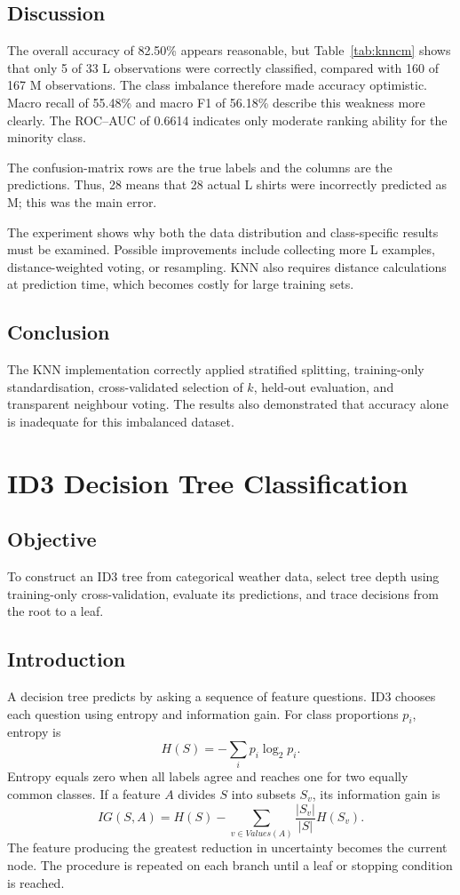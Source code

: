 \documentclass[12pt,a4paper]{report}
\newcommand{\experiment}[2]{
\chapter{#1}}
\begin{document}
\section{Discussion}
The overall accuracy of 82.50\% appears reasonable, but Table~\ref{tab:knncm} shows that only 5 of 33 L observations were correctly classified, compared with 160 of 167 M observations. The class imbalance therefore made accuracy optimistic. Macro recall of 55.48\% and macro F1 of 56.18\% describe this weakness more clearly. The ROC--AUC of 0.6614 indicates only moderate ranking ability for the minority class.

The confusion-matrix rows are the true labels and the columns are the predictions. Thus, 28 means that 28 actual L shirts were incorrectly predicted as M; this was the main error.

The experiment shows why both the data distribution and class-specific results must be examined. Possible improvements include collecting more L examples, distance-weighted voting, or resampling. KNN also requires distance calculations at prediction time, which becomes costly for large training sets.

\section{Conclusion}
The KNN implementation correctly applied stratified splitting, training-only standardisation, cross-validated selection of $k$, held-out evaluation, and transparent neighbour voting. The results also demonstrated that accuracy alone is inadequate for this imbalanced dataset.

\experiment{ID3 Decision Tree Classification}{03}

\section{Objective}
To construct an ID3 tree from categorical weather data, select tree depth using training-only cross-validation, evaluate its predictions, and trace decisions from the root to a leaf.

\section{Introduction}
A decision tree predicts by asking a sequence of feature questions. ID3 chooses each question using entropy and information gain. For class proportions $p_i$, entropy is
\begin{equation}
H(S)=-\sum_i p_i\log_2p_i.
\end{equation}
Entropy equals zero when all labels agree and reaches one for two equally common classes. If a feature $A$ divides $S$ into subsets $S_v$, its information gain is
\begin{equation}
IG(S,A)=H(S)-\sum_{v\in Values(A)}\frac{|S_v|}{|S|}H(S_v).
\end{equation}
The feature producing the greatest reduction in uncertainty becomes the current node. The procedure is repeated on each branch until a leaf or stopping condition is reached.
\end{document}
